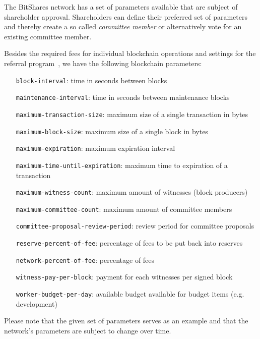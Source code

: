 The BitShares network has a set of parameters available that are subject of
shareholder approval. Shareholders can define their preferred set of parameters
and thereby create a so called \emph{committee member} or alternatively vote
for an existing committee member.


Besides the required fees for individual blockchain operations and settings for
the referral program~\cite{FIXME}, we have the following blockchain parameters:
%
\begin{itemize}
 \item [ \texttt{block-interval}:                   ] time in seconds between blocks
 \item [ \texttt{maintenance-interval}:             ] time in seconds between maintenance blocks
 \item [ \texttt{maximum-transaction-size}:         ] maximum size of a single transaction in bytes
 \item [ \texttt{maximum-block-size}:               ] maximum size of a single block in bytes
 \item [ \texttt{maximum-expiration}:               ] maximum expiration interval
 \item [ \texttt{maximum-time-until-expiration}:    ] maximum time to expiration of a transaction
 \item [ \texttt{maximum-witness-count}:            ] maximum amount of witnesses (block producers)
 \item [ \texttt{maximum-committee-count}:          ] maximum amount of committee members
 \item [ \texttt{committee-proposal-review-period}: ] review period for committee proposals
 \item [ \texttt{reserve-percent-of-fee}:           ] percentage of fees to be put back into reserves~\cite{}
 \item [ \texttt{network-percent-of-fee}:           ] percentage of fees %
 \item [ \texttt{witness-pay-per-block}:            ] payment for each witnesses per signed block
 \item [ \texttt{worker-budget-per-day}:            ] available budget available for budget items (e.g. development)~\cite{}
\end{itemize}

Please note that the given set of parameters serves as an example and that the
network's parameters are subject to change over time.
